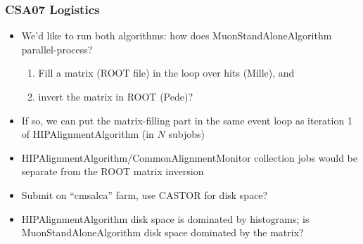 \documentclass[compress]{beamer}
\begin{document}
\begin{frame}
\frametitle{CSA07 Logistics}
\begin{itemize}\setlength{\itemsep}{0.2 cm}
\item We'd like to run both algorithms: how does MuonStandAloneAlgorithm parallel-process?
\begin{enumerate}
\item Fill a matrix (ROOT file) in the loop over hits (Mille), and
\item invert the matrix in ROOT (Pede)?
\end{enumerate}
\item If so, we can put the matrix-filling part in the same event loop
as iteration 1 of HIPAlignmentAlgorithm (in $N$ subjobs)
\item HIPAlignmentAlgorithm/CommonAlignmentMonitor collection jobs
would be separate from the ROOT matrix inversion
\end{itemize}

\begin{itemize}\setlength{\itemsep}{0.2 cm}
\item Submit on ``cmsalca'' farm, use CASTOR for disk space?
\item HIPAlignmentAlgorithm disk space is dominated by histograms; is
MuonStandAloneAlgorithm disk space dominated by the matrix?
\end{itemize}
\label{numpages}
\end{frame}
\end{document}
